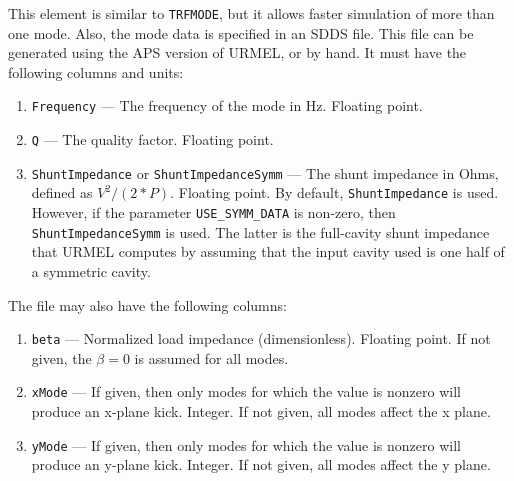 This element is similar to {\tt TRFMODE}, but it allows faster simulation of more than
one mode.  Also, the mode data is specified in an SDDS file.  This file can be
generated using the APS version of URMEL, or by hand. It must have the following
columns and units:
\begin{enumerate}
\item {\tt Frequency} --- The frequency of the mode in Hz.  Floating point.
\item {\tt Q} --- The quality factor.  Floating point.
\item {\tt ShuntImpedance} or {\tt ShuntImpedanceSymm} --- The shunt
  impedance in Ohms, defined as $V^2/(2*P)$.  Floating point. By default, {\tt ShuntImpedance} is
  used.  However, if the parameter \verb|USE_SYMM_DATA| is non-zero, then 
  {\tt ShuntImpedanceSymm}  is used.  The latter is the full-cavity 
  shunt impedance that URMEL computes
  by assuming that the input cavity used is one half of a symmetric cavity.
\end{enumerate}

The file may also have the following columns:
\begin{enumerate}
\item {\tt beta} --- Normalized load impedance (dimensionless).  Floating point. If not given, the
 $\beta=0$ is assumed for all modes. 
\item {\tt xMode} --- If given, then only modes for which the value is nonzero will produce an
 x-plane kick.  Integer.  If not given, all modes affect the x plane.
\item {\tt yMode} --- If given, then only modes for which the value is nonzero will produce an
 y-plane kick.  Integer.  If not given, all modes affect the y plane.
\end{enumerate}
    
